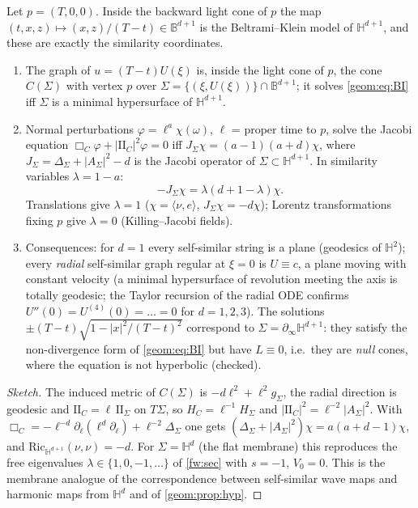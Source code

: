 \begin{proposition}
\label{geom:prop:cone}
Let $p=(T,0,0)$. Inside the backward light cone of $p$ the map
$(t,x,z)\mapsto(x,z)/(T-t)\in\mathbb{B}^{d+1}$ is the Beltrami--Klein model of
$\mathbb H^{d+1}$, and these are exactly the similarity coordinates.
\begin{enumerate}[label=(\alph*),leftmargin=*,itemsep=1pt]
\item The graph of $u=(T-t)U(\xi)$ is, inside the light cone of $p$, the
  cone $C(\Sigma)$ with vertex $p$ over
  $\Sigma=\{(\xi,U(\xi))\}\cap\mathbb{B}^{d+1}$; it solves
  \eqref{geom:eq:BI} iff $\Sigma$ is a minimal hypersurface of $\mathbb H^{d+1}$.
\item Normal perturbations $\varphi=\ell^{a}\chi(\omega)$, $\ell$ = proper
  time to $p$, solve the Jacobi equation $\Box_{C}\varphi+|\mathrm{II}_C|^2\varphi=0$
  iff $J_\Sigma\chi=(a-1)(a+d)\chi$, where
  $J_\Sigma=\Delta_\Sigma+|A_\Sigma|^2-d$ is the Jacobi operator of
  $\Sigma\subset\mathbb H^{d+1}$. In similarity variables $\lambda=1-a$:
  \[-J_\Sigma\chi=\lambda(d+1-\lambda)\chi .\]
  Translations give $\lambda=1$ ($\chi=\langle\nu,e\rangle$,
  $J_\Sigma\chi=-d\chi$); Lorentz transformations fixing $p$ give $\lambda=0$
  (Killing--Jacobi fields).
\item Consequences: for $d=1$ every self-similar string is a plane
  (geodesics of $\mathbb H^2$); every \emph{radial} self-similar graph regular at
  $\xi=0$ is $U\equiv c$, a plane moving with constant velocity (a minimal
  hypersurface of revolution meeting the axis is totally geodesic; the Taylor
  recursion of the radial ODE confirms $U''(0)=U^{(4)}(0)=\dots=0$ for
  $d=1,2,3$). The solutions $\pm(T-t)\sqrt{1-|x|^2/(T-t)^2}$ correspond to
  $\Sigma=\partial_\infty\mathbb H^{d+1}$: they satisfy the non-divergence
  form of \eqref{geom:eq:BI} but have $L\equiv0$, i.e.\ they are \emph{null}
  cones, where the equation is not hyperbolic (checked).
\end{enumerate}
\end{proposition}
\begin{proof}[Sketch]
The induced metric of $C(\Sigma)$ is $-d\ell^2+\ell^2g_\Sigma$, the radial
direction is geodesic and $\mathrm{II}_C=\ell\,\mathrm{II}_\Sigma$ on
$T\Sigma$, so $H_C=\ell^{-1}H_\Sigma$ and $|\mathrm{II}_C|^2=\ell^{-2}|A_\Sigma|^2$.
With $\Box_C=-\ell^{-d}\partial_\ell(\ell^d\partial_\ell)+\ell^{-2}\Delta_\Sigma$
one gets $(\Delta_\Sigma+|A_\Sigma|^2)\chi=a(a+d-1)\chi$, and
$\mathrm{Ric}_{\mathbb H^{d+1}}(\nu,\nu)=-d$. For $\Sigma=\mathbb H^d$ (the flat
membrane) this reproduces the free eigenvalues $\lambda\in\{1,0,-1,\dots\}$
of \cref{fw:sec} with $s=-1$, $V_0=0$. This is the membrane analogue of the
correspondence between self-similar wave maps and harmonic maps from
$\mathbb H^d$ \cite{CazenaveShatahTahvildarZadeh1998} and of
\cref{geom:prop:hyp}.
\end{proof}

